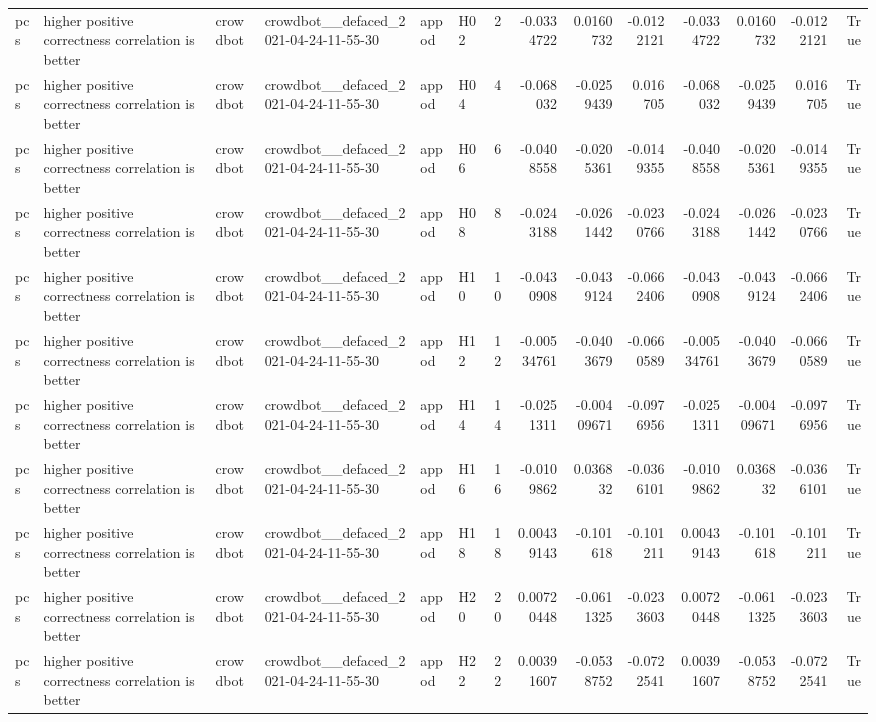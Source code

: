 \begin{longtable}{llllllrrrrrrrr}
pcs & higher positive correctness correlation is better & crowdbot & crowdbot\_\_defaced\_2021-04-24-11-55-30 & appod & H02 & 2 & -0.0334722 & 0.0160732 & -0.0122121 & -0.0334722 & 0.0160732 & -0.0122121 & True \\
pcs & higher positive correctness correlation is better & crowdbot & crowdbot\_\_defaced\_2021-04-24-11-55-30 & appod & H04 & 4 & -0.068032 & -0.0259439 & 0.016705 & -0.068032 & -0.0259439 & 0.016705 & True \\
pcs & higher positive correctness correlation is better & crowdbot & crowdbot\_\_defaced\_2021-04-24-11-55-30 & appod & H06 & 6 & -0.0408558 & -0.0205361 & -0.0149355 & -0.0408558 & -0.0205361 & -0.0149355 & True \\
pcs & higher positive correctness correlation is better & crowdbot & crowdbot\_\_defaced\_2021-04-24-11-55-30 & appod & H08 & 8 & -0.0243188 & -0.0261442 & -0.0230766 & -0.0243188 & -0.0261442 & -0.0230766 & True \\
pcs & higher positive correctness correlation is better & crowdbot & crowdbot\_\_defaced\_2021-04-24-11-55-30 & appod & H10 & 10 & -0.0430908 & -0.0439124 & -0.0662406 & -0.0430908 & -0.0439124 & -0.0662406 & True \\
pcs & higher positive correctness correlation is better & crowdbot & crowdbot\_\_defaced\_2021-04-24-11-55-30 & appod & H12 & 12 & -0.00534761 & -0.0403679 & -0.0660589 & -0.00534761 & -0.0403679 & -0.0660589 & True \\
pcs & higher positive correctness correlation is better & crowdbot & crowdbot\_\_defaced\_2021-04-24-11-55-30 & appod & H14 & 14 & -0.0251311 & -0.00409671 & -0.0976956 & -0.0251311 & -0.00409671 & -0.0976956 & True \\
pcs & higher positive correctness correlation is better & crowdbot & crowdbot\_\_defaced\_2021-04-24-11-55-30 & appod & H16 & 16 & -0.0109862 & 0.036832 & -0.0366101 & -0.0109862 & 0.036832 & -0.0366101 & True \\
pcs & higher positive correctness correlation is better & crowdbot & crowdbot\_\_defaced\_2021-04-24-11-55-30 & appod & H18 & 18 & 0.00439143 & -0.101618 & -0.101211 & 0.00439143 & -0.101618 & -0.101211 & True \\
pcs & higher positive correctness correlation is better & crowdbot & crowdbot\_\_defaced\_2021-04-24-11-55-30 & appod & H20 & 20 & 0.00720448 & -0.0611325 & -0.0233603 & 0.00720448 & -0.0611325 & -0.0233603 & True \\
pcs & higher positive correctness correlation is better & crowdbot & crowdbot\_\_defaced\_2021-04-24-11-55-30 & appod & H22 & 22 & 0.00391607 & -0.0538752 & -0.0722541 & 0.00391607 & -0.0538752 & -0.0722541 & True \\

\end{longtable}
